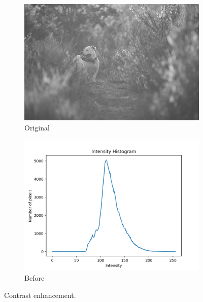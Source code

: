 \documentclass[11pt,a4paper]{article}
\begin{document}
\begin{figure}[ht]
	\ContinuedFloat*
	\centering
	\begin{subfigure}[h]{0.7\textwidth}
		\includegraphics[width=\textwidth]{figs/lc1_gray}
		\caption{Original}
		\label{fig:lc1_orig}
	\end{subfigure}
	\par\bigskip
	\begin{subfigure}[h]{0.75\textwidth}
		\includegraphics[width=\textwidth]{figs/lc1_hist_bef}
		\caption{Before}
		\label{fig:hist_bef_1}
	\end{subfigure}
	
	\caption{Contrast enhancement.}
	\label{fig:eq1}
\end{figure}

\clearpage
\end{document}
